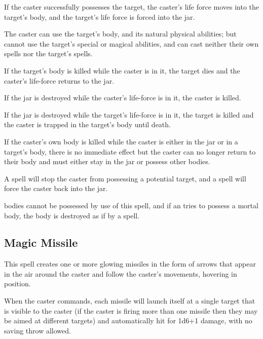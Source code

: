 \begin{multicols*}{2}
If the caster successfully possesses the target, the caster’s life force moves into the target’s body, and the target’s life force is forced into the jar.

The caster can use the target’s body, and its natural physical abilities; but cannot use the target’s special or magical abilities, and can cast neither their own spells nor the target’s spells.

If the target’s body is killed while the caster is in it, the target dies and the caster’s life-force returns to the jar.

If the jar is destroyed while the caster’s life-force is in it, the caster is killed.

If the jar is destroyed while the target’s life-force is in it, the target is killed and the caster is trapped in the target’s body until death.

If the caster’s own body is killed while the caster is either in the jar or in a target’s body, there is no immediate effect but the caster can no longer return to their body and must either stay in the jar or possess other bodies.

A  spell will stop the caster from possessing a potential target, and a  spell will force the caster back into the jar.

 bodies cannot be possessed by use of this spell, and if an  tries to possess a mortal body, the body is destroyed as if by a  spell.

\subsection{Magic Missile}\label{spell:Magic Missile}

This spell creates one or more glowing missiles in the form of arrows that appear in the air around the caster and follow the caster’s movements, hovering in position.

When the caster commands, each missile will launch itself at a single target that is visible to the caster (if the caster is firing more than one missile then they may be aimed at different targets) and automatically hit for 1d6+1 damage, with no saving throw allowed.


\end{multicols*}
